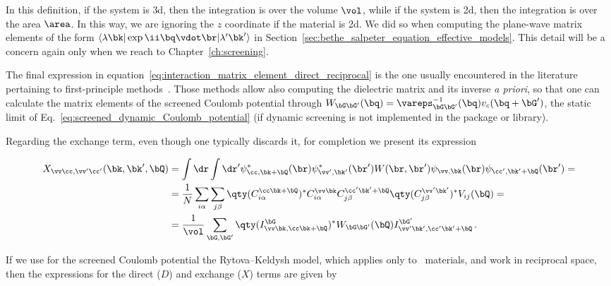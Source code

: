 \noindent In this definition, if the system is \gls{3d}, then the integration is over the volume $\vol$, while if the system is \gls{2d}, then the integration is over the area $\area$.
In this way, we are ignoring the $z$ coordinate if the material is \gls{2d}.
We did so when computing the plane-wave matrix elements of the form $\langle \lambda \bk | \exp{\ii \bq \vdot \br} | \lambda' \bk' \rangle$ in Section~\ref{sec:bethe_salpeter_equation_effective_models}.
This detail will be a concern again only when we reach to Chapter~\ref{ch:screening}.

The final expression in equation~\eqref{eq:interaction_matrix_element_direct_reciprocal} is the one usually encountered in the literature pertaining to first-principle methods~\cite{BerkeleyGW,Yambo_2009}.
Those methods allow also computing the dielectric matrix and its inverse \textit{a priori}, so that one can calculate the matrix elements of the screened Coulomb potential through $W_{\bG\bG'}(\bq) = \vareps^{-1}_{\bG\bG'}(\bq) v_c(\bq + \bG')$, the static limit of Eq.~\eqref{eq:screened_dynamic_Coulomb_potential} (if dynamic screening is not implemented in the package or library).

Regarding the exchange term, even though one typically discards it, for completion we present its expression

\begin{equation}
    \label{eq:interaction_matrix_element_exchange_reciprocal}
    \begin{split}
        X_{\vv \cc , \vv ' \cc '}(\bk,\bk',\bQ) &= \int \dr \int \dr' \psi^*_{\cc ,\bk+\bQ}(\br) \psi^*_{\vv ',\bk'}(\br') W(\br,\br') \psi_{\vv,\bk}(\br) \psi_{\cc ',\bk'+\bQ}(\br') = \\
                                  &= \frac{1}{N} \sum_{i \alpha}  \sum_{j \beta} \qty(C_{i \alpha}^{\cc  \bk+ \bQ})^*   C_{i \alpha}^{\vv \bk} C_{j \beta}^{\cc ' \bk' + \bQ} \qty(C_{j \beta}^{\vv ' \bk'})^* V_{ij}(\bQ) = \\
                                  &= \frac{1}{\vol} \sum_{\bG,\bG'} \qty(I^{\bG}_{\vv \bk , \cc  \bk+\bQ})^* W_{\bG \bG'}(\bQ) I^{\bG'}_{\vv ' \bk',  \cc ' \bk' + \bQ}\,.
    \end{split}
\end{equation}

If we use for the screened Coulomb potential the Rytova--Keldysh model, which applies only to \bd~materials, and work in reciprocal space, then the expressions for the direct ($D$) and exchange ($X$) terms are given by

